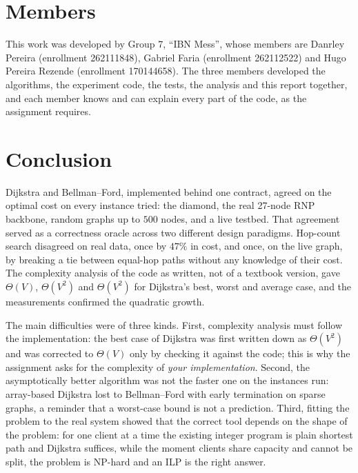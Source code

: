 \documentclass[11pt,a4paper]{article}
\begin{document}
\section{Members}
\label{sec:members}

This work was developed by Group 7, ``IBN Mess'', whose members are Danrley Pereira (enrollment 262111848),
Gabriel Faria (enrollment 262112522) and Hugo Pereira Rezende (enrollment 170144658). The three members developed the
algorithms, the experiment code, the tests, the analysis and this report together, and each member knows and
can explain every part of the code, as the assignment requires.

\section{Conclusion}
\label{sec:conclusion}

Dijkstra and Bellman--Ford, implemented behind one contract, agreed on the optimal cost on every instance tried: the diamond, the real
27-node RNP backbone, random graphs up to $500$ nodes, and a live testbed. That agreement served as a correctness oracle across two different
design paradigms. Hop-count search disagreed on real data, once by $47\%$ in cost, and once, on the live graph, by breaking a tie between
equal-hop paths without any knowledge of their cost. The complexity analysis of the code as written, not of a textbook version, gave
$\Theta(V)$, $\Theta(V^2)$ and $\Theta(V^2)$ for Dijkstra's best, worst and average case, and the measurements confirmed the quadratic growth.

The main difficulties were of three kinds. First, complexity analysis must follow the implementation: the best case of Dijkstra was first written down
as $\Theta(V^2)$ and was corrected to $\Theta(V)$ only by checking it against the code; this is why the assignment asks for the complexity of
\emph{your implementation}. Second, the asymptotically better algorithm was not the faster one on the instances run: array-based Dijkstra lost to
Bellman--Ford with early termination on sparse graphs, a reminder that a worst-case bound is not a prediction. Third, fitting the problem to the
real system showed that the correct tool depends on the shape of the problem: for one client at a time the existing integer program is plain
shortest path and Dijkstra suffices, while the moment clients share capacity and cannot be split, the problem is NP-hard and an ILP is the right
answer.



\end{document}

